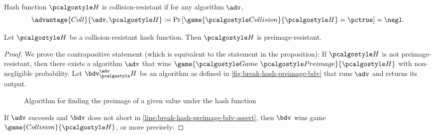 \begin{definition}
  Hash function $\algo{H}$ is collision-resistant if for any \ppt algorithm $\adv$,
 \[
  \advantage{Coll}{\adv, \algo{H}} \defeq \pr{\game{\algo{Collision}}{\algo{H}} = \pctrue} = \negl.
 \]
\end{definition}

\begin{lemma}
  Let $\algo{H}$ be a collision-resistant hash function. Then $\algo{H}$ is preimage-resistant.
\end{lemma}
\begin{proof}
  We prove the contrapositive statement (which is equivalent to the statement in the proposition):
  If $\algo{H}$ is not preimage-resistant, then there exists a \ppt algorithm $\adv$ that wins $\game{\Game~\algo{Preimage}}{\algo{H}}$ with non-negligible probability.
  Let $\bdv^\adv_\algo{H}$ be an algorithm as defined in \autoref{fig:break-hash-preimage-bdv} that runs $\adv$ and returns its output.
  \begin{figure}[tbhp]
  \begin{center}
    \begin{tcolorbox}[width=4cm]
      \begin{pchstack}[center]
      \end{pchstack}
    \end{tcolorbox}
  \end{center}
  \caption{Algorithm for finding the preimage of a given value under the hash function \label{fig:break-hash-preimage-bdv}}
  \end{figure}
  If $\adv$ succeeds and $\bdv$ does not abort in \cref{line:break-hash-preimage-bdv-assert}, then $\bdv$ wins game $\game{Collision}{\algo{H}}$, or more precisely:


\end{proof}
